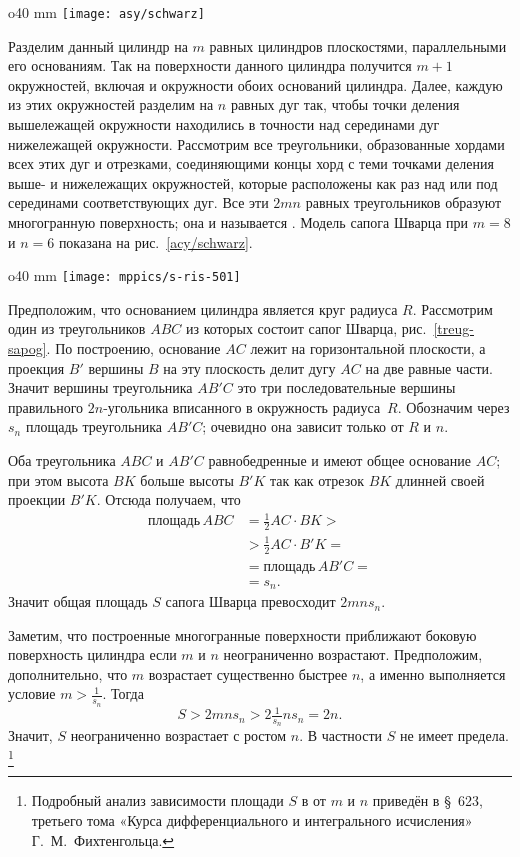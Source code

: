 \begin{wrapfigure}{o}{40 mm}
\centering
\texttt{[image: asy/schwarz]}
\caption{}
\label{acy/schwarz}
\end{wrapfigure}

Разделим данный цилиндр на $m$ равных цилиндров плоскостями, параллельными его основаниям.
Так на поверхности данного цилиндра получится $m+1$ окружностей, включая и окружности обоих оснований цилиндра.
Далее, каждую из этих окружностей разделим на $n$ равных дуг так, чтобы точки деления вышележащей окружности находились в точности над серединами дуг нижележащей окружности.
Рассмотрим все треугольники, образованные хордами всех этих дуг и отрезками, соединяющими концы хорд с теми точками деления выше- и нижележащих окружностей, которые расположены как раз над или под серединами соответствующих дуг.
Все эти $2mn$ равных треугольников образуют многогранную поверхность; 
она и называется .
Модель сапога Шварца при $m=8$ и $n=6$ показана на рис.~\ref{acy/schwarz}.


\begin{wrapfigure}{o}{40 mm}
\centering
\texttt{[image: mppics/s-ris-501]}
\caption{}\label{treug-sapog}
\end{wrapfigure}

Предположим, что основанием цилиндра является круг радиуса $R$.
Рассмотрим один из треугольников $ABC$ из которых состоит сапог Шварца, рис.~\ref{treug-sapog}.
По построению, основание $AC$ лежит на горизонтальной плоскости,
а проекция $B'$ вершины $B$ на эту плоскость делит дугу $AC$ на две равные части.
Значит вершины треугольника $AB'C$ это три последовательные вершины правильного $2n$-угольника вписанного в окружность радиуса~$R$.
Обозначим через $s_n$ площадь треугольника $AB'C$; очевидно она зависит только от $R$ и $n$.
 
Оба треугольника $ABC$ и $AB'C$ равнобедренные и имеют общее основание $AC$;
при этом высота $BK$ больше высоты $B'K$ так как отрезок $BK$ длинней своей проекции $B'K$.
Отсюда получаем, что
\begin{align*}
\text{площадь}\, ABC&=\tfrac12 AC\cdot BK>
\\
&>\tfrac12 AC\cdot B'K=
\\
&=\text{площадь}\, AB'C=
\\
&=s_n.
\end{align*}
Значит общая площадь $S$ сапога Шварца превосходит $2mns_n$.

Заметим, что построенные многогранные поверхности приближают боковую поверхность цилиндра если $m$ и $n$ неограниченно возрастают.
Предположим, дополнительно, что $m$ возрастает существенно быстрее $n$,
а именно выполняется условие $m>\tfrac1{s_n}$.
Тогда
\[S> 2 m n s_n>2 \tfrac1{s_n} n s_n=2n.\]
Значит, $S$ неограниченно возрастает с ростом $n$.
В частности $S$ не имеет предела.%
\footnote{Подробный анализ зависимости площади $S$ в от $m$ и $n$ приведён в §~623, третьего тома  «Курса дифференциального и интегрального исчисления» Г.~М.~Фихтенгольца.}


